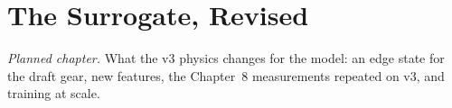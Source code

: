 \chapter{The Surrogate, Revised}
\label{ch:surrogate_revised}


\emph{Planned chapter.} What the v3 physics changes for the model: an edge state for the draft gear, new features, the Chapter~8 measurements repeated on v3, and training at scale.

